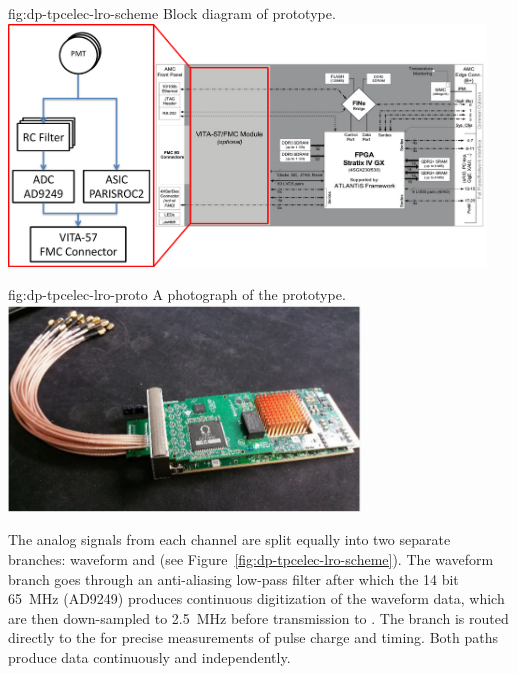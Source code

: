 \begin{dunefigure}{fig:dp-tpcelec-lro-scheme}
{Block diagram of  prototype.}
\includegraphics[width=0.95\textwidth]{graphics/dp-tpcelec-lro-scheme}
\end{dunefigure}


\begin{dunefigure}{fig:dp-tpcelec-lro-proto}
{A photograph of the  prototype.}
\includegraphics[width=0.7\textwidth]{graphics/dp-tpcelec-lro-proto}
\end{dunefigure}

The analog signals from each  channel are split equally into two separate branches: waveform and  (see Figure~\ref{fig:dp-tpcelec-lro-scheme}). %
The waveform branch goes through an anti-aliasing low-pass filter after which the \num{14} bit \SI{65}{\MHz}  (AD9249) produces continuous digitization of the  waveform data, which are then down-sampled to \SI{2.5}{MHz} before transmission to . The  branch is routed directly to the   for precise measurements of pulse charge and timing. Both paths produce data continuously and independently.
